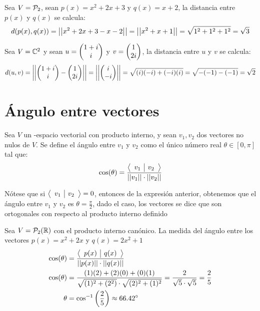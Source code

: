 \begin{ejemplo}
    Sea $V = \mathcal{P}_2$, sean $p(x) = x^2 + 2x + 3$ y $q(x) = x + 2$, la distancia entre $p(x)$ y $q(x)$ se calcula:
    $$d(p(x),q(x)) = \left|\left| x^2 + 2x +3 - x -2 \right|\right| = \left|\left| x^2 +x +1 \right|\right| = \sqrt{1^2 + 1^2 + 1^2}  = \sqrt{3}$$
\end{ejemplo}

\begin{ejemplo}
    Sea $V = \mathbb{C}^2$ y sean $u = \begin{pmatrix} 1+i\\ i\\ \end{pmatrix} $ y $v = \begin{pmatrix} 1\\ 2i\\ \end{pmatrix} $, la distancia entre $u$ y $v$ se calcula:
    $$d(u,v) = \left|\left| \begin{pmatrix} 1+i\\ i\\ \end{pmatrix}  - \begin{pmatrix} 1\\ 2i\\ \end{pmatrix}  \right|\right| = \left|\left| \begin{pmatrix} i\\ -i\\ \end{pmatrix}  \right|\right| = \sqrt{(i)(-i) + (-i)(i)} = \sqrt{-(-1) -(-1)} = \sqrt{2}$$
\end{ejemplo}

\section{Ángulo entre vectores}

\begin{dfn}
Sea $V$ un \dobleK-espacio vectorial con producto interno, y sean $v_1,v_2$ dos vectores no nulos de $V$. Se define el ángulo entre $v_1$ y $v_2$ como el único número real $\theta \in [0,\pi]$ tal que: 
$$\cos(\theta) = \frac{\left\langle \begin{array}{c|c} v_1 & v_2 \end{array}\right\rangle}{\left|\left| v_1 \right|\right| \cdot \left|\left| v_2 \right|\right|}$$
\end{dfn}

\begin{obs}
    Nótese que si $\left\langle \begin{array}{c|c} v_1 & v_2 \end{array}\right\rangle = 0$, entonces de la expresión anterior, obtenemos que el ángulo entre $v_1$ y $v_2$ es $\theta = \frac{\pi}{2}$, dado el caso, los vectores se dice que son ortogonales con respecto al producto interno definido
\end{obs}

\begin{ejemplo}
    Sea $V = \mathcal{P}_2(\mathbb{R})$ con el producto interno canónico. La medida del ángulo entre los vectores $p(x) = x^2 + 2x$ y $q(x) = 2x^2 +1$
    \begin{align*}
        \cos(\theta) &= \frac{\left\langle \begin{array}{c|c} p(x) & q(x) \end{array}\right\rangle}{\left|\left| p(x) \right|\right| \cdot \left|\left| q(x) \right|\right|}\\
        \cos(\theta) &= \frac{(1)(2) + (2)(0) + (0)(1)}{\sqrt{(1)^2 + (2^2)} \cdot \sqrt{(2)^2 + (1)^2}} = \frac{2}{\sqrt{5}\cdot \sqrt{5}} = \frac{2}{5}\\
        \theta &= \cos^{-1}\left(\frac{2}{5}\right) \approx 66.42^\circ
    \end{align*}

\end{ejemplo}

